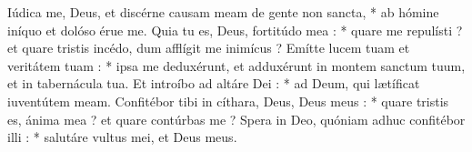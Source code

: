 Iúdica me, Deus, et discérne causam meam de gente non sancta, * ab hómine iníquo et dolóso érue me.
Quia tu es, Deus, fortitúdo mea : * quare me repulísti ? et quare tristis incédo, dum afflígit me inimícus ?
Emítte lucem tuam et veritátem tuam : * ipsa me deduxérunt, et adduxérunt in montem sanctum tuum, et in tabernácula tua.
Et introíbo ad altáre Dei : * ad Deum, qui lætíficat iuventútem meam.
Confitébor tibi in cíthara, Deus, Deus meus : * quare tristis es, ánima mea ? et quare contúrbas me ?
Spera in Deo, quóniam adhuc confitébor illi : * salutáre vultus mei, et Deus meus.
